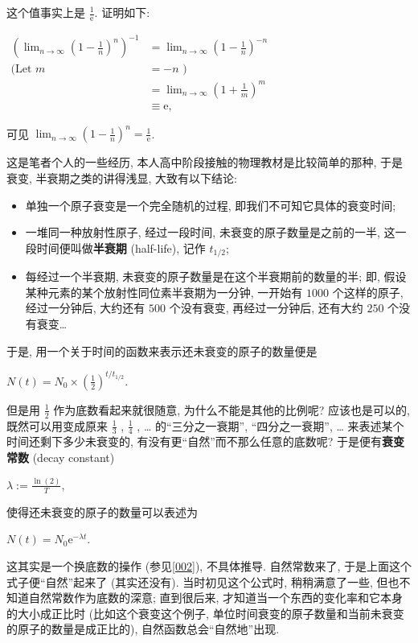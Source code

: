 \begin{tcolorbox}[size=fbox, breakable, enhanced jigsaw, title={抽卡}]
这个值事实上是 $\frac{1}{\mathrm{e}}$. {\kaishu 证明}如下:

$\begin{aligned}\left(\lim_{n\rightarrow\infty}\left (1-\frac{1}{n}\right)^n\right)^{-1}&=\lim_{n\rightarrow\infty}\left (1-\frac{1}{n}\right)^{-n}\\\text{(Let }m&=-n\text{ )}\\&=\lim_{n\rightarrow\infty}\left (1+\frac{1}{m}\right)^m\\&\equiv\mathrm{e,}\end{aligned}$

可见
$\boxed{\lim_{n\rightarrow\infty}\left (1-\frac{1}{n}\right)^n=\frac{1}{\mathrm{e}}}$.

\end{tcolorbox}

\begin{tcolorbox}[size=fbox, breakable, enhanced jigsaw, title={衰变}]

这是笔者个人的一些经历, 本人高中阶段接触的物理教材是比较简单的那种,
于是衰变, 半衰期之类的讲得浅显, 大致有以下结论:

\begin{itemize}

\item
  单独一个原子衰变是一个完全随机的过程, 即我们不可知它具体的衰变时间;
\item 
  一堆同一种放射性原子, 经过一段时间, 未衰变的原子数量是之前的一半,
  这一段时间便叫做\textbf{半衰期} (half-life), 记作 $t_{1/2}$;
\item
  每经过一个半衰期, 未衰变的原子数量是在这个半衰期前的数量的半; 即,
  假设某种元素的某个放射性同位素半衰期为一分钟, 一开始有 $1000$
  个这样的原子, 经过一分钟后, 大约还有 $500$ 个没有衰变,
  再经过一分钟后, 还有大约 $250$ 个没有衰变\ldots{}
\end{itemize}

于是, 用一个关于时间的函数来表示还未衰变的原子的数量便是

$N(t)=N_0\times\left(\frac{1}{2}\right)^{t/t_{1/2}}.$

但是用 $\frac{1}{2}$ 作为底数看起来就很随意, 为什么不能是其他的比例呢?
应该也是可以的, 既然可以用变成原来 $\frac{1}{3}$ , $\frac{1}{4}$ ,
\ldots{} 的``三分之一衰期'', ``四分之一衰期'', \ldots{}
来表述某个时间还剩下多少未衰变的, 有没有更``自然''而不那么任意的底数呢?
于是便有\textbf{衰变常数} (decay constant)

$\lambda:=\frac{\ln(2)}{T},$

使得还未衰变的原子的数量可以表述为

$N(t)=N_0\mathrm{e}^{-\lambda t}.$

这其实是一个换底数的操作 (参见\ref{002}), 不具体推导. 自然常数来了,
于是上面这个式子便``自然''起来了 (其实还没有). 当时初见这个公式时,
稍稍满意了一些, 但也不知道自然常数作为底数的深意; 直到很后来,
才知道当一个东西的变化率和它本身的大小成正比时 (比如这个衰变这个例子,
单位时间衰变的原子数量和当前未衰变的原子的数量是成正比的),
自然函数总会``自然地''出现.

\end{tcolorbox}